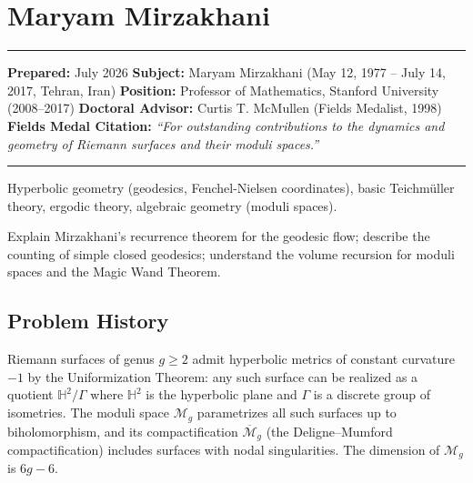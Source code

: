 \chapter{Maryam Mirzakhani}\label{ch2014maryammirzakhani:maryam-mirzakhani-fields-medal-2014-a-comprehensive-report-on-her-work-and-impact}

\begin{center}\rule{0.5\linewidth}{0.5pt}\end{center}

\textbf{Prepared:} July 2026 \textbf{Subject:} Maryam Mirzakhani (May 12, 1977 -- July 14, 2017, Tehran, Iran) \textbf{Position:} Professor of Mathematics, Stanford University (2008--2017) \textbf{Doctoral Advisor:} Curtis T. McMullen (Fields Medalist, 1998) \textbf{Fields Medal Citation:} \emph{``For outstanding contributions to the dynamics and geometry of Riemann surfaces and their moduli spaces.''}

\begin{center}\rule{0.5\linewidth}{0.5pt}\end{center}

\begin{prereqs} Hyperbolic geometry (geodesics, Fenchel-Nielsen coordinates), basic Teichm\"uller theory, ergodic theory, algebraic geometry (moduli spaces). \end{prereqs}

\begin{objectives} Explain Mirzakhani's recurrence \cite{mirzakhani2007} theorem for the geodesic flow; describe the counting of simple closed geodesics; understand the volume recursion for moduli spaces and the Magic Wand Theorem. \end{objectives}

\section{Problem History}

Riemann surfaces of genus $g \ge 2$ admit hyperbolic metrics of constant curvature $-1$ by the Uniformization Theorem: any such surface can be realized as a quotient $\mathbb{H}^2/\Gamma$ where $\mathbb{H}^2$ is the hyperbolic plane and $\Gamma$ is a discrete group of isometries. The moduli space $\mathcal{M}_g$ parametrizes all such surfaces up to biholomorphism, and its compactification $\overline{\mathcal{M}}_g$ (the Deligne--Mumford compactification) includes surfaces with nodal singularities. The dimension of $\mathcal{M}_g$ is $6g-6$.

